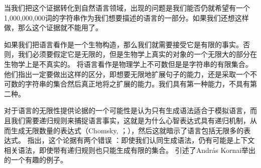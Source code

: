 当我们把这个证据转化到自然语言领域，出现的问题是我们能否仍就希望有一个1,000,000,000词的字符串作为我们想要描述的语言的一部分。如果我们还想这样做，那么这个证据就不能用了。

如果我们把语言看作是一个生物构造，那么我们就需要接受它是有限的事实。否则，我们必须要假定它是无限的，但是生物学上真实的对象的一个无限大的部分在生物学上是不真实的\citep[]{Postal2009a}。 \citet{LL2011a}将语言看作是物理学上不可数但是是字符串的有限集合。他们指出一定要做出这样的区分，即想要无限地扩展句子的能力，还是采取一个不可数的字符串的集合然后真正地将之扩展的能力。我们具有第一种能力，不具有第二种。

对于语言的无限性提供论据的一个可能性是认为只有生成语法适合于模拟语言，而且我们需要递归规则来捕捉语言事实，这就是为什么心智表达式具有递归机制，从而生成无限数量的表达式（Chomsky, \citeyear[]{Chomsky56a-u}；\citeyear[--87]{Chomsky2002a-u}），然后这就暗示了语言包括无限多的表达式。 \citet{PS2010a}指出，这个论据有两个错误 \citet{PS2010a}：即使我们认同生成语法，仍有可能是上下文相关语法，即使带有递归规则也只能生成有限的集合。 \citet[120--121]{PS2010a}引述了Andr{\'a}s Kornai举出的一个有趣的例子。

